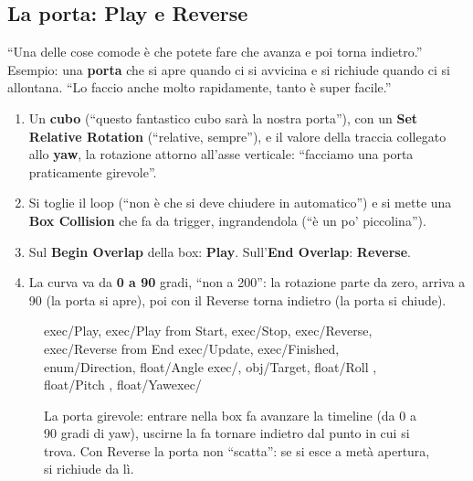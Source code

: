 \subsection{La porta: Play e Reverse}

``Una delle cose comode è che potete fare che avanza e poi torna indietro.''
Esempio: una \textbf{porta} che si apre quando ci si avvicina e si richiude
quando ci si allontana. ``Lo faccio anche molto rapidamente, tanto è super
facile.''
\begin{enumerate}
  \item Un \textbf{cubo} (``questo fantastico cubo sarà la nostra porta''),
        con un \textbf{Set Relative Rotation} (``relative, sempre''), e il
        valore della traccia collegato allo \textbf{yaw}, la rotazione attorno
        all'asse verticale: ``facciamo una porta praticamente girevole''.
  \item Si toglie il loop (``non è che si deve chiudere in automatico'') e si
        mette una \textbf{Box Collision} che fa da trigger, ingrandendola
        (``è un po' piccolina'').
  \item Sul \textbf{Begin Overlap} della box: \textbf{Play}. Sull'\textbf{End
        Overlap}: \textbf{Reverse}.
  \item La curva va da \textbf{0 a 90} gradi, ``non a 200'': la rotazione
        parte da zero, arriva a 90 (la porta si apre), poi con il Reverse torna
        indietro (la porta si chiude).
\end{enumerate}

\begin{figure}[htbp]
\centering
\begin{bpgraph}
    {exec/Play, exec/Play from Start, exec/Stop, exec/Reverse, exec/Reverse from End}%
    {exec/Update, exec/Finished, enum/Direction, float/Angle}
    {exec/, obj/Target, float/Roll , float/Pitch , float/Yaw}{exec/}
\end{bpgraph}
\caption{La porta girevole: entrare nella box fa avanzare la timeline (da 0 a
90 gradi di yaw), uscirne la fa tornare indietro dal punto in cui si trova. Con
Reverse la porta non ``scatta'': se si esce a metà apertura, si richiude da
lì.}
\label{gd12:fig:porta}
\end{figure}

